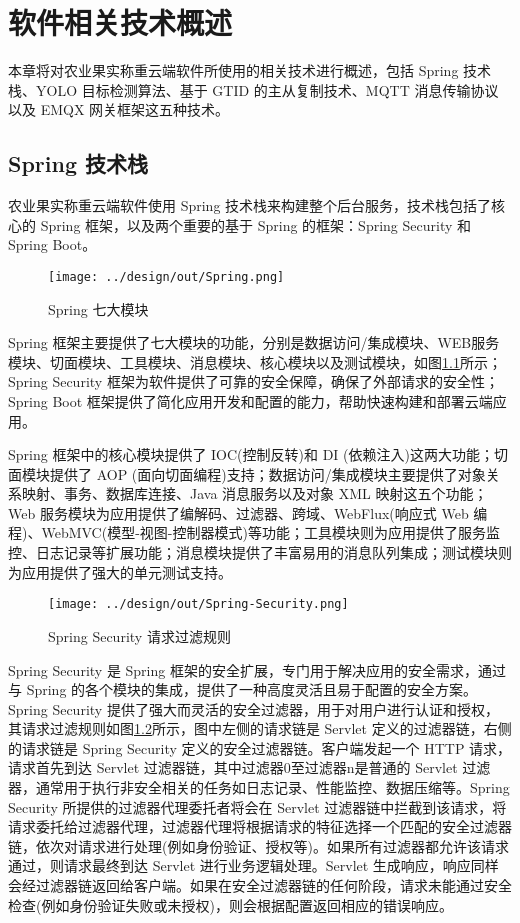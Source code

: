 \chapter{软件相关技术概述}

本章将对农业果实称重云端软件所使用的相关技术进行概述，包括 Spring 技术栈、YOLO 目标检测算法、基于 GTID 的主从复制技术、MQTT 消息传输协议以及 EMQX 网关框架这五种技术。

\section{Spring 技术栈}\label{sec:spring}

农业果实称重云端软件使用 Spring 技术栈来构建整个后台服务，技术栈包括了核心的 Spring 框架，以及两个重要的基于 Spring 的框架：Spring Security 和 Spring Boot。

\begin{figure}[H]
    \centering
    \texttt{[image: ../design/out/Spring.png]}
    \caption{Spring 七大模块}
    \label{fig:Spring}
\end{figure}

Spring 框架主要提供了七大模块的功能，分别是数据访问/集成模块、WEB服务模块、切面模块、工具模块、消息模块、核心模块以及测试模块，如图\ref{fig:Spring}所示；Spring Security 框架为软件提供了可靠的安全保障，确保了外部请求的安全性；Spring Boot 框架提供了简化应用开发和配置的能力，帮助快速构建和部署云端应用。

Spring 框架中的核心模块提供了 IOC(控制反转)和 DI (依赖注入)这两大功能；切面模块提供了 AOP (面向切面编程)支持；数据访问/集成模块主要提供了对象关系映射、事务、数据库连接、Java 消息服务以及对象 XML 映射这五个功能；Web 服务模块为应用提供了编解码、过滤器、跨域、WebFlux(响应式 Web 编程)、WebMVC(模型-视图-控制器模式)等功能；工具模块则为应用提供了服务监控、日志记录等扩展功能；消息模块提供了丰富易用的消息队列集成；测试模块则为应用提供了强大的单元测试支持\cite{Spring-框架概述}。

\begin{figure}
    \centering
    \texttt{[image: ../design/out/Spring-Security.png]}
    \caption{Spring Security 请求过滤规则}
    \label{fig:Spring-Security}
\end{figure}

Spring Security 是 Spring 框架的安全扩展，专门用于解决应用的安全需求，通过与 Spring 的各个模块的集成，提供了一种高度灵活且易于配置的安全方案。Spring Security 提供了强大而灵活的安全过滤器，用于对用户进行认证和授权，其请求过滤规则如图\ref{fig:Spring-Security}所示，图中左侧的请求链是 Servlet 定义的过滤器链，右侧的请求链是 Spring Security 定义的安全过滤器链。客户端发起一个 HTTP 请求，请求首先到达 Servlet 过滤器链，其中过滤器0至过滤器n是普通的 Servlet 过滤器，通常用于执行非安全相关的任务如日志记录、性能监控、数据压缩等。Spring Security 所提供的过滤器代理委托者将会在 Servlet 过滤器链中拦截到该请求，将请求委托给过滤器代理，过滤器代理将根据请求的特征选择一个匹配的安全过滤器链，依次对请求进行处理(例如身份验证、授权等)。如果所有过滤器都允许该请求通过，则请求最终到达 Servlet 进行业务逻辑处理。Servlet 生成响应，响应同样会经过滤器链返回给客户端。如果在安全过滤器链的任何阶段，请求未能通过安全检查(例如身份验证失败或未授权)，则会根据配置返回相应的错误响应\cite{Spring-Security-架构设计}。

